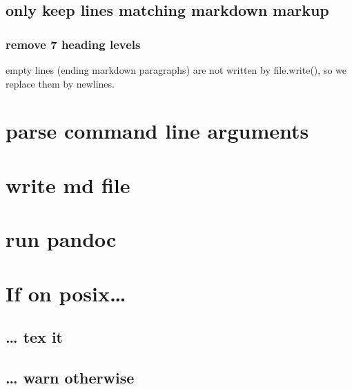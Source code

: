 \documentclass[]{article}
\begin{document}
\subsection{only keep lines matching markdown markup}

\subsubsection{remove 7 heading levels}

empty lines (ending markdown paragraphs) are not written by
file.write(), so we replace them by newlines.

\section{parse command line arguments}

\section{write md file}

\section{run pandoc}

\section{If on posix\ldots{}}

\subsection{\ldots{} tex it}

\subsection{\ldots{} warn otherwise}
\end{document}
